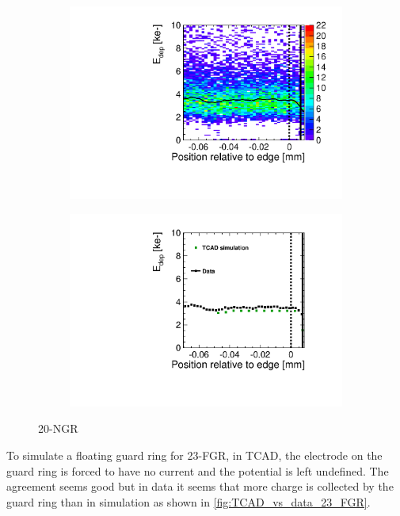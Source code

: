 \begin{figure}[htbp]
  \centering
  \begin{subfigure}[b]{0.5\textwidth}
    \includegraphics[width=\textwidth]{figures/ActiveEdge/TCAD_data_Edep_20_NGR.pdf}
    \caption{}
  \end{subfigure}\hfill
  \begin{subfigure}[b]{0.5\textwidth}
    \includegraphics[width=\textwidth]{figures/ActiveEdge/TCAD_data_20_NGR.pdf}
    \caption{}
  \end{subfigure}
  \caption{20-NGR}
  \label{fig:TCAD_vs_data_20_NGR}
\end{figure}

To simulate a floating guard ring for 23-FGR, in TCAD, the electrode
on the guard ring is forced to have no current and the potential is
left undefined. The agreement seems good but in data it seems that
more charge is collected by the guard ring than in simulation as shown
in \cref{fig:TCAD_vs_data_23_FGR}.
 
